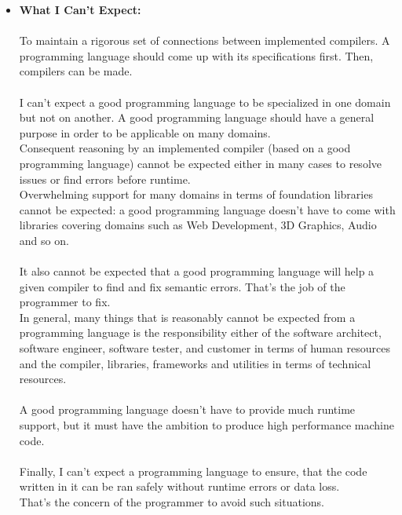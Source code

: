 \documentclass{article}
\begin{document}
\begin{itemize}
  \item \textbf{What I Can't Expect:}\\\\
  \-To maintain a rigorous set of connections between implemented compilers. A programming language should come up with its specifications first.
  Then, compilers can be made.
  \\
  \\
  \-I can't expect a good programming language to be specialized in one domain but not on another. A good programming language should have a general purpose
  in order to be applicable on many domains.
  \\
  Consequent reasoning by an implemented compiler (based on a good programming language) cannot be expected
  either in many cases to resolve issues or find errors before runtime.
  \\
  \-Overwhelming support for many domains in terms of foundation libraries cannot be expected: a good programming language doesn't have to come 
  with libraries covering domains such as Web Development, 3D Graphics, Audio and so on.
  \\
  \\
  It also cannot be expected that a good programming language will help a given compiler to find and fix semantic errors. That's the job of the programmer to fix.
  \\
  In general, many things that is reasonably cannot be expected from a programming language is the responsibility either of the 
  software architect, software engineer, software tester, and customer in terms of human resources and the compiler, libraries, frameworks and utilities
  in terms of technical resources.
  \\
  \\
  \-A good programming language doesn't have to provide much runtime support, but it must have the ambition to produce high performance machine code.
  \\
  \\
  Finally, I can't expect a programming language to ensure, that the code written in it can be ran safely without runtime errors or data loss. 
  \\
  That's the concern of the programmer to avoid such situations.
 \end{itemize}
\end{document}
